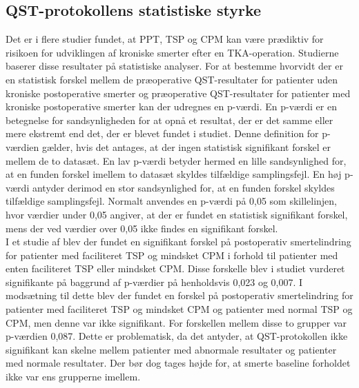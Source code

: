 \subsection{QST-protokollens statistiske styrke}
Det er i flere studier fundet, at PPT, TSP og CPM kan være prædiktiv for risikoen for udviklingen af kroniske smerter efter en TKA-operation. \citep{Petersen2015} \citep{Petersen2016} \citep{Wylde2016c} Studierne baserer disse resultater på statistiske analyser. For at bestemme hvorvidt der er en statistisk forskel mellem de præoperative QST-resultater for patienter uden kroniske postoperative smerter og præoperative QST-resultater for patienter med kroniske postoperative smerter kan der udregnes en p-værdi. En p-værdi er en betegnelse for sandsynligheden for at opnå et resultat, der er det samme eller mere ekstremt end det, der er blevet fundet i studiet. Denne definition for p-værdien gælder, hvis det antages, at der ingen statistisk signifikant forskel er mellem de to datasæt. En lav p-værdi betyder hermed en lille sandsynlighed for, at en funden forskel imellem to datasæt skyldes tilfældige samplingsfejl. En høj p-værdi antyder derimod en stor sandsynlighed for, at en funden forskel skyldes tilfældige samplingsfejl. Normalt anvendes en p-værdi på 0,05 som skillelinjen, hvor værdier under 0,05 angiver, at der er fundet en statistisk signifikant forskel, mens der ved værdier over 0,05 ikke findes en signifikant forskel. \citep{Zar2010} \\
I et studie af  blev der fundet en signifikant forskel på postoperativ smertelindring for patienter med faciliteret TSP og mindsket CPM i forhold til patienter med enten faciliteret TSP eller mindsket CPM. Disse forskelle blev i studiet vurderet signifikante på baggrund af p-værdier på henholdsvis 0,023 og 0,007. I modsætning til dette blev der fundet en forskel på postoperativ smertelindring for patienter med faciliteret TSP og mindsket CPM og patienter med normal TSP og CPM, men denne var ikke signifikant. For forskellen mellem disse to grupper var p-værdien 0,087. \citep{Petersen2016} Dette er problematisk, da det antyder, at QST-protokollen ikke signifikant kan skelne mellem patienter med abnormale resultater og patienter med normale resultater. Der bør dog tages højde for, at smerte baseline forholdet ikke var ens grupperne imellem. \\ %
